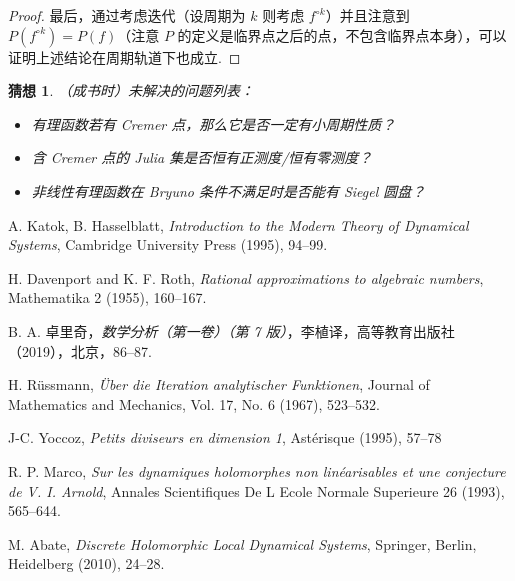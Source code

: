 \documentclass[11pt, a4paper, oneside]{ctexart}
\newtheorem{conjecture}[theorem]{猜想}
\begin{document}
\begin{proof}
        最后，通过考虑迭代（设周期为 $k$ 则考虑 $f^{\circ k}$）并且注意到 $P(f^{\circ k})=P(f)$（注意 $P$ 的定义是临界点之后的点，不包含临界点本身），可以证明上述结论在周期轨道下也成立.
    \end{proof}

    \begin{conjecture}
        （成书时）未解决的问题列表：
        \begin{itemize}
            \item 有理函数若有 Cremer 点，那么它是否一定有小周期性质？
            \item 含 Cremer 点的 Julia 集是否恒有正测度/恒有零测度？
            \item 非线性有理函数在 Bryuno 条件不满足时是否能有 Siegel 圆盘？
        \end{itemize}
    \end{conjecture}

    \begin{thebibliography}{}
        A. Katok, B. Hasselblatt, \emph{Introduction to the Modern Theory of Dynamical Systems}, Cambridge University Press (1995), 94--99.

        H. Davenport and K. F. Roth, \emph{Rational approximations to algebraic numbers}, Mathematika 2 (1955), 160--167.

        B. A. 卓里奇，\emph{数学分析（第一卷）（第 7 版）}，李植译，高等教育出版社（2019），北京，86--87.

        H. Rüssmann, \emph{Über die Iteration analytischer Funktionen}, Journal of Mathematics and Mechanics, Vol. 17, No. 6 (1967), 523--532.

        J-C. Yoccoz, \emph{Petits diviseurs en dimension 1}, Astérisque (1995), 57--78

        R. P. Marco, \emph{Sur les dynamiques holomorphes non linéarisables et une conjecture de V. I. Arnold}, Annales Scientifiques De L Ecole Normale Superieure 26 (1993), 565--644.

        M. Abate, \emph{Discrete Holomorphic Local Dynamical Systems}, Springer, Berlin, Heidelberg (2010), 24--28.
    \end{thebibliography}
\end{document}
